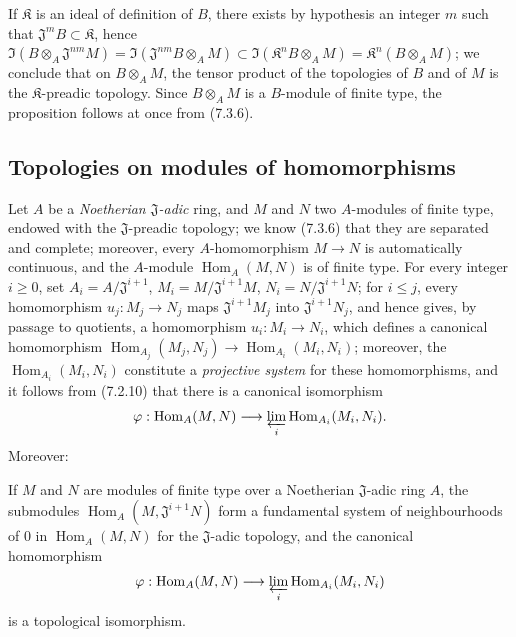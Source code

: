 If $\mathfrak K$ is an ideal of definition of $B$, there exists by hypothesis
an integer $m$ such that $\mathfrak J^mB\subset\mathfrak K$, hence
$\Im(B\otimes_A\mathfrak J^{nm}M)=
\Im(\mathfrak J^{nm}B\otimes_A M)\subset
\Im(\mathfrak K^nB\otimes_A M)=\mathfrak K^n(B\otimes_A M)$; we
conclude that on $B\otimes_A M$, the tensor product of the topologies of $B$
and of $M$ is the $\mathfrak K$-preadic topology. Since $B\otimes_A M$
is a $B$-module of finite type, the proposition follows at once from (7.3.6).

\subsection{Topologies on modules of homomorphisms}
\label{subsection:0.7.8}

\begin{env}[7.8.1]
\label{0.7.8.1}
Let $A$ be a \emph{Noetherian $\mathfrak J$-adic} ring, and $M$ and $N$ two
$A$-modules of finite type, endowed with the $\mathfrak J$-preadic topology;
we know (7.3.6) that they are separated and complete; moreover, every
$A$-homomorphism $M\to N$ is automatically continuous, and the $A$-module
$\operatorname{Hom}_A(M,N)$ is of finite type. For every integer $i\geq 0$, set
$A_i=A/\mathfrak J^{i+1}$, $M_i=M/\mathfrak J^{i+1}M$,
$N_i=N/\mathfrak J^{i+1}N$; for $i\leq j$, every homomorphism
$u_j:M_j\to N_j$ maps $\mathfrak J^{i+1}M_j$ into
$\mathfrak J^{i+1}N_j$, and hence gives, by passage to quotients, a
homomorphism $u_i:M_i\to N_i$, which defines a canonical homomorphism
$\operatorname{Hom}_{A_j}(M_j,N_j)\to\operatorname{Hom}_{A_i}(M_i,N_i)$; moreover, the
$\operatorname{Hom}_{A_i}(M_i,N_i)$ constitute a \emph{projective system} for these
homomorphisms, and it follows from (7.2.10) that there is a canonical
isomorphism
\[
  \varphi:\operatorname{Hom}_A(M,N)\longrightarrow
  \varprojlim_i\operatorname{Hom}_{A_i}(M_i,N_i).
\]
Moreover:
\end{env}

\begin{proposition}[7.8.2]
\label{0.7.8.2}
If $M$ and $N$ are modules of finite type over a Noetherian $\mathfrak J$-adic
ring $A$, the submodules $\operatorname{Hom}_A(M,\mathfrak J^{i+1}N)$ form a
fundamental system of neighbourhoods of $0$ in $\operatorname{Hom}_A(M,N)$ for the
$\mathfrak J$-adic topology, and the canonical homomorphism
\[
  \varphi:\operatorname{Hom}_A(M,N)\longrightarrow
  \varprojlim_i\operatorname{Hom}_{A_i}(M_i,N_i)
\]
is a topological isomorphism.
\end{proposition}

